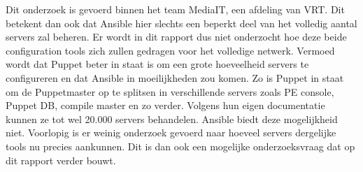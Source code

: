 Dit onderzoek is gevoerd binnen het team MediaIT, een afdeling van \gls{VRT}. Dit betekent dan ook dat Ansible hier slechts een beperkt deel van het volledig aantal servers zal beheren. Er wordt in dit rapport dus niet onderzocht hoe deze beide configuration tools zich zullen gedragen voor het volledige netwerk. Vermoed wordt dat Puppet beter in staat is om een grote hoeveelheid servers te configureren en dat Ansible in moeilijkheden zou komen. Zo is Puppet in staat om de Puppetmaster op te splitsen in verschillende servers zoals PE console, Puppet DB, compile master en zo verder. Volgens hun eigen documentatie kunnen ze tot wel 20.000 servers behandelen. Ansible biedt deze mogelijkheid niet. Voorlopig is er weinig onderzoek gevoerd naar hoeveel servers dergelijke tools nu precies aankunnen. Dit is dan ook een mogelijke onderzoeksvraag dat op dit rapport verder bouwt.